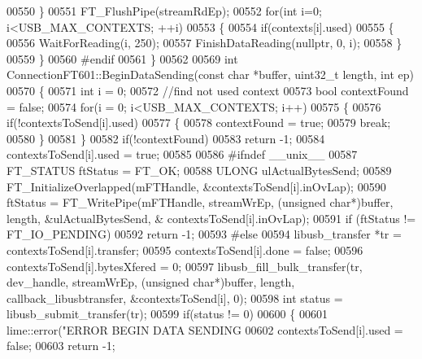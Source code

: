\begin{DoxyCode}
{{{{00550     \}
00551     FT\_FlushPipe(streamRdEp);
00552     \textcolor{keywordflow}{for}(\textcolor{keywordtype}{int} i=0; i<USB\_MAX\_CONTEXTS; ++i)
00553     \{
00554         \textcolor{keywordflow}{if}(contexts[i].used)
00555         \{
00556             WaitForReading(i, 250);
00557             FinishDataReading(\textcolor{keyword}{nullptr}, 0, i);
00558         \}
00559     \}
00560 \textcolor{preprocessor}{#endif}
00561 \}
00562 
00569 \textcolor{keywordtype}{int} ConnectionFT601::BeginDataSending(\textcolor{keyword}{const} \textcolor{keywordtype}{char} *buffer, uint32\_t length, \textcolor{keywordtype}{int} ep)
00570 \{
00571     \textcolor{keywordtype}{int} i = 0;
00572     \textcolor{comment}{//find not used context}
00573     \textcolor{keywordtype}{bool} contextFound = \textcolor{keyword}{false};
00574     \textcolor{keywordflow}{for}(i = 0; i<USB\_MAX\_CONTEXTS; i++)
00575     \{
00576         \textcolor{keywordflow}{if}(!contextsToSend[i].used)
00577         \{
00578             contextFound = \textcolor{keyword}{true};
00579             \textcolor{keywordflow}{break};
00580         \}
00581     \}
00582     \textcolor{keywordflow}{if}(!contextFound)
00583         \textcolor{keywordflow}{return} -1;
00584     contextsToSend[i].used = \textcolor{keyword}{true};
00585 
00586 \textcolor{preprocessor}{#ifndef \_\_unix\_\_}
00587     FT_STATUS ftStatus = FT_OK;
00588     ULONG ulActualBytesSend;
00589     FT\_InitializeOverlapped(mFTHandle, &contextsToSend[i].inOvLap);
00590     ftStatus = FT\_WritePipe(mFTHandle, streamWrEp, (\textcolor{keywordtype}{unsigned} \textcolor{keywordtype}{char}*)buffer, length, &ulActualBytesSend, &
      contextsToSend[i].inOvLap);
00591     \textcolor{keywordflow}{if} (ftStatus != FT_IO_PENDING)
00592         \textcolor{keywordflow}{return} -1;
00593 \textcolor{preprocessor}{#else}
00594     libusb\_transfer *tr = contextsToSend[i].transfer;
00595     contextsToSend[i].done = \textcolor{keyword}{false};
00596     contextsToSend[i].bytesXfered = 0;
00597     libusb\_fill\_bulk\_transfer(tr, dev\_handle, streamWrEp, (\textcolor{keywordtype}{unsigned} \textcolor{keywordtype}{char}*)buffer, length, 
      callback\_libusbtransfer, &contextsToSend[i], 0);
00598     \textcolor{keywordtype}{int} status = libusb\_submit\_transfer(tr);
00599     \textcolor{keywordflow}{if}(status != 0)
00600     \{
00601         lime::error(\textcolor{stringliteral}{"ERROR BEGIN DATA SENDING %
00602         contextsToSend[i].used = \textcolor{keyword}{false};
00603         \textcolor{keywordflow}{return} -1;
}}}}}
\end{DoxyCode}
